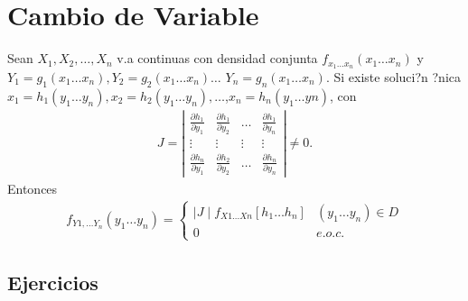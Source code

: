 \section{Cambio de Variable}

\begin{Teo}
Sean $X_{1}, X_{2},\ldots,X _{n}$ v.a continuas con densidad conjunta $f_{x_{1}\ldots x_{n}}\left( x_{1} \ldots x_{n}\right)$ y $Y_{1}=g_{1} \left(x_{1}\ldots x_{n}\right),Y_{2}=g_{2} \left(x_{1}\ldots x_{n}  \right)\ldots $ $Y_{n}= g_{n} \left(x_{1}\ldots x_{n}\right)$. Si existe soluci?n ?nica $x_{1}=h_{1}\left(y_{1}\ldots y_{n}\right),x_{2}=h_{2}\left(y_{1}\ldots y_{n}\right),\ldots$,$x_{n}=h_{n} \left(y_{1}\ldots y{n}\right)$, con 
\begin{eqnarray*}
J= \left| 
\begin{array}{cccc}
\frac{\partial h_{1}}{\partial y_{1}} & \frac{\partial h_{1}}{\partial y_{2}} & \ldots & \frac{\partial h_{1}}{\partial y_{n}}\\
\vdots & \vdots & \vdots & \vdots \\
\frac{\partial h_{n}}{\partial y_{1}} & \frac{\partial h_{2}}{\partial y_{2}} & \ldots & \frac{\partial h_{n}}{\partial y_{n}}
\end{array}
\right|
\neq 0.
\end{eqnarray*}
 Entonces
\begin{eqnarray*}
f_{Y1, \ldots Y_{n}}\left( y_{1} \ldots y_{n} \right)=\begin{cases}
\mid J \mid f_{X1 \ldots Xn}\left[h_{1} \ldots h_{n}\right] & \left(y_{1} \ldots y_{n} \right) \in D \\  
0 & e.o.c.
\end{cases}
\end{eqnarray*}
\end{Teo}
\subsection{Ejercicios}

